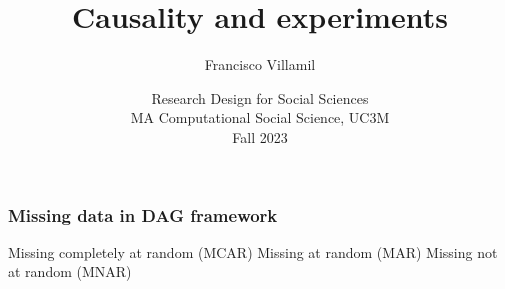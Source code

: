 \documentclass[aspectratio=43]{beamer}
\title[Lecture 3: Causality and experiments]{\Large Causality and experiments}
\author[]{Francisco Villamil}
\date[]{Research Design for Social Sciences\\MA Computational Social Science, UC3M\\Fall 2023}
\begin{document}

\begin{frame}
  \titlepage
\end{frame}

\begin{frame}
\frametitle{Missing data in DAG framework}
\centering

Missing completely at random (MCAR)
Missing at random (MAR)
Missing not at random (MNAR)

\end{frame}



\end{document}

